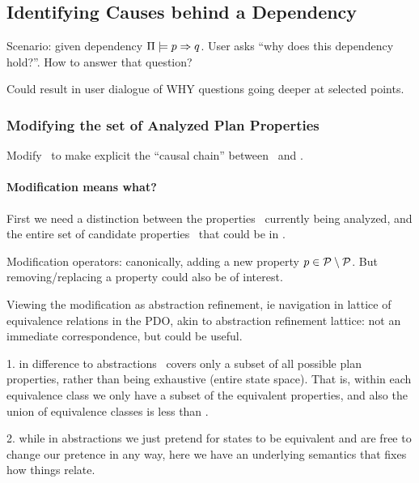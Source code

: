 







\subsection{Identifying Causes behind a Dependency}
\label{xpp:identify-causes}

Scenario: given dependency $\Pi \models p \Rightarrow q$. User
asks ``why does this dependency hold?''. How to answer that question?

Could result in user dialogue of WHY questions going deeper at
selected points.




\subsubsection{Modifying the set of Analyzed Plan Properties}
\label{xpp:identify-causes:analyzed}


Modify \props\ to make explicit the ``causal chain'' between
\prop\ and \propq.



\paragraph{Modification means what?}

First we need a distinction between the properties \props\ currently
being analyzed, and the entire set of candidate properties
\candprops\ that could be in \props.

Modification operators: canonically, adding a new property $p \in
\cal P \setminus P$. But removing/replacing a property could
also be of interest.

Viewing the modification as abstraction refinement, ie navigation in
lattice of equivalence relations in the PDO, akin to abstraction
refinement lattice: not an immediate correspondence, but could be
useful.

1. in difference to abstractions \props\ covers only a subset of all
possible plan properties, rather than being exhaustive (entire state
space). That is, within each equivalence class we only have a subset
of the equivalent properties, and also the union of equivalence
classes is less than \candprops.

2. while in abstractions we just pretend for states to be equivalent
and are free to change our pretence in any way, here we have an
underlying semantics that fixes how things relate.

